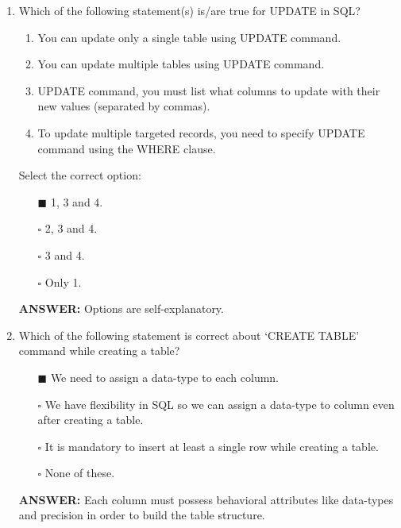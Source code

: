 \documentclass[10pt]{article}
\begin{document}
\begin{enumerate}
		\item Which of the following statement(s) is/are true for UPDATE in SQL?
			\begin{enumerate}
				\item You can update only a single table using UPDATE command.
				\item You can update multiple tables using UPDATE command.
				\item UPDATE command, you must list what columns to update with their new values (separated by commas).
				\item To update multiple targeted records, you need to specify UPDATE command using the WHERE clause.
			\end{enumerate}
			Select the correct option:
			\begin{enumerate}
				\item[$\blacksquare$] 1, 3 and 4.
				\item[$\square$] 2, 3 and 4.
				\item[$\square$] 3 and 4.
				\item[$\square$] Only 1.
			\end{enumerate}
			\color{red} \textbf{ANSWER:} \color{black} Options are self-explanatory.
		
		\item Which of the following statement is correct about ‘CREATE TABLE’ command while creating a table?
			\begin{enumerate}
				\item[$\blacksquare$] We need to assign a data-type to each column.
				\item[$\square$] We have flexibility in SQL so we can assign a data-type to column even after creating a table.
				\item[$\square$] It is mandatory to insert at least a single row while creating a table.
				\item[$\square$] None of these.
			\end{enumerate}
			\color{red} \textbf{ANSWER:} \color{black} Each column must possess behavioral attributes like data-types and precision in order to build the table structure.


\end{enumerate}
\end{document}
